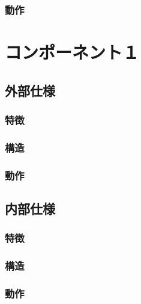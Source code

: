 \documentclass{jsreport}
\begin{document}
        \subsubsection{動作}
        
\section{コンポーネント１}
	\subsection{外部仕様}
        \subsubsection{特徴}
        \subsubsection{構造}
        \subsubsection{動作}    
    
    \subsection{内部仕様}
        \subsubsection{特徴}
        \subsubsection{構造}
        \subsubsection{動作}    
\end{document}
